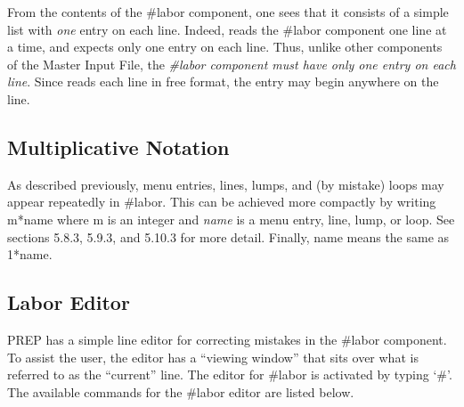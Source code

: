 From the contents of the \#labor component, one sees that it consists of a
simple list with {\em one} entry on each line. Indeed, \Mary reads the
\#labor component one line at a time, and expects only one entry on each
line. Thus, unlike other components of the Master Input File, the {\em
\#labor component must have only one entry on each line}. Since \Mary reads
each line in free format, the entry may begin anywhere on the line.

\subsection{Multiplicative Notation} As described previously, menu entries,
lines, lumps, and (by mistake) loops may appear repeatedly in \#labor. This
can be achieved more compactly by writing m*name where m is an integer and
{\em name} is a menu entry, line, lump, or loop. See sections 5.8.3, 5.9.3,
and 5.10.3 for more detail. Finally, name means the same as 1*name.

\subsection{Labor Editor} PREP has a simple line editor for correcting
mistakes in the \#labor component. To assist the user, the editor has a
``viewing window'' that sits over what is referred to as the ``current''
line. The editor for \#labor is activated by typing `\#'. The available
commands for the \#labor editor are listed below.

